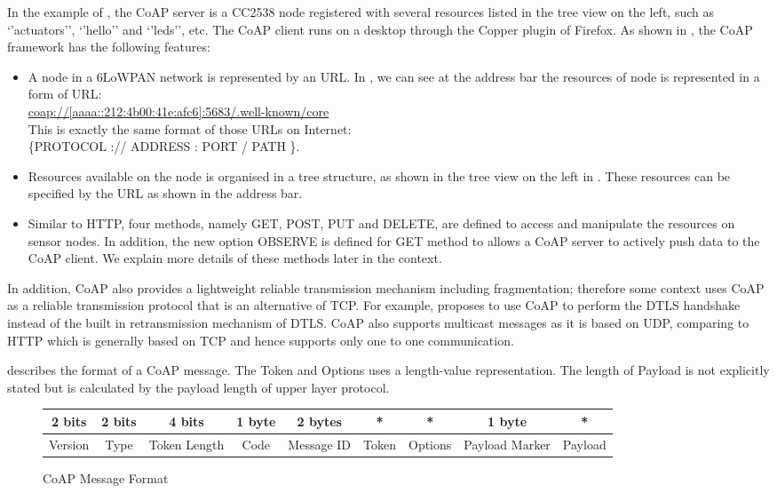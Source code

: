 In the example of , the CoAP server is a CC2538 node registered with several resources listed in the tree view on the left, such as ‘’actuators’’, ‘’hello’’ and ‘’leds’’, etc. The CoAP client runs on a desktop through the Copper plugin\cite{Copper} of Firefox. As shown in , the CoAP framework has the following features:
\begin{itemize}
	\item A node in a 6LoWPAN network is represented by an URL. In , we can see at the address bar the resources of node is represented in a form of URL:\\
	\url{coap://[aaaa::212:4b00:41e:afc6]:5683/.well-known/core} \\
	This is exactly the same format of those URLs on Internet\cite{rfc3986}: \\
	 \{PROTOCOL :// ADDRESS : PORT / PATH \}.
	 \item Resources available on the node is organised in a tree structure, as shown in the tree view on the left in . These resources can be specified by the URL as shown in the address bar.
	 \item Similar to HTTP, four methods, namely GET, POST, PUT and DELETE, are defined to access and manipulate the resources on sensor nodes. In addition, the new option OBSERVE is defined for GET method to allows a CoAP server to actively push data to the CoAP client. We explain more details of these methods later in the context.
\end{itemize}

In addition, CoAP also provides a lightweight reliable transmission mechanism including fragmentation\cite{CoapBlock}; therefore some context uses CoAP as a reliable transmission protocol that is an alternative of TCP. For example, \cite{CoDTLS} proposes to use CoAP to perform the DTLS handshake instead of the built in retransmission mechanism of DTLS. CoAP also supports multicast messages as it is based on UDP, comparing to HTTP which is generally based on TCP and  hence supports only one to one communication.

 describes the format of a CoAP message. The Token and Options uses a length-value representation. The length of Payload is not explicitly stated but is calculated by the payload length of upper layer protocol.
\begin{figure}[h!]
	\center
	\begin{tabular}{|c|c|c|c|c|c|c|c|c|}
	\hline
	2 bits  & 2 bits & 4 bits       & 1 byte & 2 bytes   & * & *       & 1 byte    & *       \\ \hline
	Version & Type   & Token Length & Code   & Message ID & Token                 & Options & Payload Marker & Payload \\ \hline
	\end{tabular}
	\caption{CoAP Message Format}
	\label{Fig: CoAP Message Format}
\end{figure}

